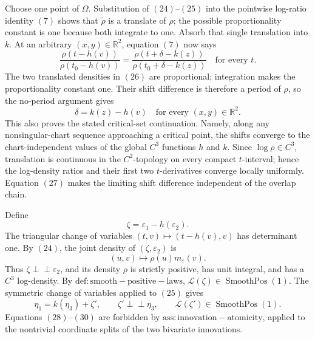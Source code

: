 Choose one point of \(\Omega\).  Substitution of \((24)\)--\((25)\) into the pointwise log-ratio identity \((7)\) shows that \(\widetilde\rho\) is a translate of \(\rho\); the possible proportionality constant is one because both integrate to one.  Absorb that single translation into \(k\).  At an arbitrary \((x,y)\in\mathbb R^2\), equation \((7)\) now says
\[
 \frac{\rho(t-h(v))}{\rho(t_0-h(v))}
 =\frac{\rho(t+\delta-k(z))}{\rho(t_0+\delta-k(z))}
 \quad\text{for every }t.
\tag{26}
\]
The two translated densities in \((26)\) are proportional; integration makes the proportionality constant one.  Their shift difference is therefore a period of \(\rho\), so the no-period argument gives
\[
 \delta=k(z)-h(v)
 \quad\text{for every }(x,y)\in\mathbb R^2.
\tag{27}
\]
This also proves the stated critical-set continuation.  Namely, along any nonsingular-chart sequence approaching a critical point, the shifts converge to the chart-independent values of the global \(C^3\) functions \(h\) and \(k\).  Since \(\log\rho\in C^3\), translation is continuous in the \(C^2\)-topology on every compact \(t\)-interval; hence the log-density ratios and their first two \(t\)-derivatives converge locally uniformly.  Equation \((27)\) makes the limiting shift difference independent of the overlap chain.

Define
\[
 \zeta=\varepsilon_1-h(\varepsilon_2).
\tag{28}
\]
The triangular change of variables \((t,v)\mapsto(t-h(v),v)\) has determinant one.  By \((24)\), the joint density of \((\zeta,\varepsilon_2)\) is
\[
 (u,v)\longmapsto\rho(u)m_\varepsilon(v).
\tag{29}
\]
Thus \(\zeta\perp\!\!\!\perp\varepsilon_2\), and its density \(\rho\) is strictly positive, has unit integral, and has a \(C^3\) log-density.  By \(\mathrm{def:smooth-positive-laws}\), \(\mathcal L(\zeta)\in\operatorname{SmoothPos}(1)\).  The symmetric change of variables applied to \((25)\) gives
\[
 \eta_1=k(\eta_3)+\zeta',
 \qquad
 \zeta'\perp\!\!\!\perp\eta_3,
 \qquad
 \mathcal L(\zeta')\in\operatorname{SmoothPos}(1).
\tag{30}
\]
Equations \((28)\)--\((30)\) are forbidden by \(\mathrm{ass:innovation-atomicity}\), applied to the nontrivial coordinate splits of the two bivariate innovations.

